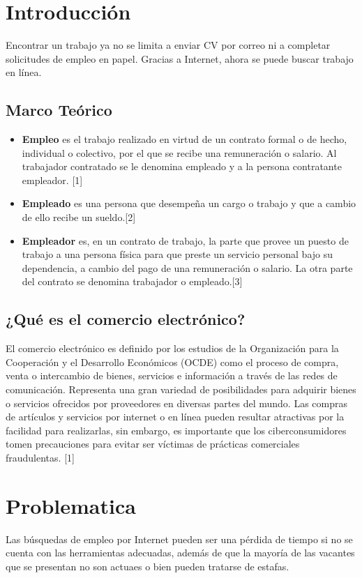 \section{Introducción}
Encontrar un trabajo ya no se limita a enviar CV por correo ni a completar solicitudes de empleo en papel. Gracias a Internet, ahora se puede buscar trabajo en línea. 

\subsection{Marco Teórico }
\begin{itemize}
\item \textbf{Empleo} es el trabajo realizado en virtud de un contrato formal o de hecho, individual o colectivo, por el que se recibe una remuneración o salario. Al trabajador contratado se le denomina empleado y a la persona contratante empleador. [1]
\item \textbf{Empleado} es una persona que desempeña un cargo o trabajo y que a cambio de ello recibe un sueldo.[2]
\item \textbf{Empleador} es, en un contrato de trabajo, la parte que provee un puesto de trabajo a una persona física para que preste un servicio personal bajo su dependencia, a cambio del pago de una remuneración o salario. La otra parte del contrato se denomina trabajador o empleado.[3]
\end{itemize}


\subsection{¿Qué es el comercio electrónico?}
El comercio electrónico es definido por los estudios de la Organización para la Cooperación y el Desarrollo Económicos (OCDE) como el proceso de compra, venta o intercambio de bienes, servicios e información a través de las redes de comunicación. Representa una gran variedad de posibilidades para adquirir bienes o servicios ofrecidos por proveedores en diversas partes del mundo. Las compras de artículos y servicios por internet o en línea pueden resultar atractivas por la facilidad para realizarlas, sin embargo, es importante que los ciberconsumidores tomen precauciones para evitar ser víctimas de prácticas comerciales fraudulentas. [1]




\newpage
\section{Problematica}
Las búsquedas de empleo por Internet pueden ser una pérdida de tiempo si no se cuenta con las herramientas adecuadas, además de que la mayoría de las vacantes que se presentan no son actuaes o bien pueden tratarse de estafas.


